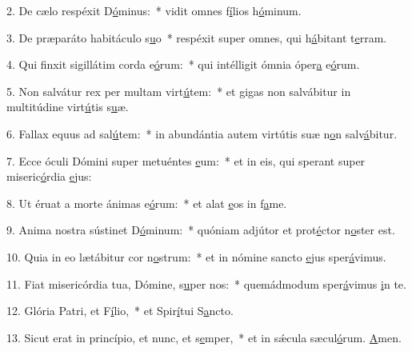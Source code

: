 2. De cælo respéxit D\uline{ó}minus:~* vidit omnes f\uline{í}lios h\uline{ó}minum.\par 
3. De præparáto habitáculo s\uline{u}o~* respéxit super omnes, qui h\uline{á}bitant t\uline{e}rram.\par 
4. Qui finxit sigillátim corda e\uline{ó}rum:~* qui intélligit ómnia óper\uline{a} e\uline{ó}rum.\par 
5. Non salvátur rex per multam virt\uline{ú}tem:~* et gigas non salvábitur in multitúdine virt\uline{ú}tis s\uline{u}æ.\par 
6. Fallax equus ad sal\uline{ú}tem:~* in abundántia autem virtútis suæ n\uline{o}n salv\uline{á}bitur.\par 
7. Ecce óculi Dómini super metuéntes \uline{e}um:~* et in eis, qui sperant super miseric\uline{ó}rdia \uline{e}jus:\par 
8. Ut éruat a morte ánimas e\uline{ó}rum:~* et alat \uline{e}os in f\uline{a}me.\par 
9. Anima nostra sústinet D\uline{ó}minum:~* quóniam adjútor et prot\uline{é}ctor n\uline{o}ster est.\par 
10. Quia in eo lætábitur cor n\uline{o}strum:~* et in nómine sancto \uline{e}jus sper\uline{á}vimus.\par 
11. Fiat misericórdia tua, Dómine, s\uline{u}per nos:~* quemádmodum sper\uline{á}vimus \uline{i}n te.\par 
12. Glória Patri, et F\uline{í}lio,~* et Spir\uline{í}tui S\uline{a}ncto.\par 
13. Sicut erat in princípio, et nunc, et s\uline{e}mper,~* et in sǽcula sæcul\uline{ó}rum. \uline{A}men.\par 
